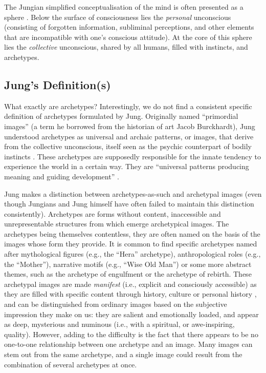 \documentclass[
]{book}
\begin{document}
The Jungian simplified conceptualisation of the mind is often presented as a sphere \citep{cann1986jungian}. Below the surface of consciousness lies the \emph{personal} unconscious (consisting of forgotten information, subliminal perceptions, and other elements that are incompatible with one's conscious attitude). At the core of this sphere lies the \emph{collective} unconscious, shared by all humans, filled with instincts, and archetypes.

\hypertarget{jungs-definitions}{%
\subsection{Jung's Definition(s)}\label{jungs-definitions}}

What exactly are archetypes? Interestingly, we do not find a consistent specific definition of archetypes formulated by Jung. Originally named ``primordial images'' (a term he borrowed from the historian of art Jacob Burckhardt), Jung understood archetypes as universal and archaic patterns, or images, that derive from the collective unconscious, itself seen as the psychic counterpart of bodily instincts \citep{feist2009theories}. These archetypes are supposedly responsible for the innate tendency to experience the world in a certain way. They are ``universal patterns producing meaning and guiding development'' \citep{roesler2012archetypes}.

Jung makes a distinction between archetypes-as-such and archetypal images (even though Jungians and Jung himself have often failed to maintain this distinction consistently). Archetypes are forms without content, inaccessible and unrepresentable structures from which emerge archetypical images. The archetypes being themselves contentless, they are often named on the basis of the images whose form they provide. It is common to find specific archetypes named after mythological figures (e.g., the ``Hera'' archetype), anthropological roles (e.g., the ``Mother''), narrative motifs (e.g., ``Wise Old Man'') or some more abstract themes, such as the archetype of engulfment or the archetype of rebirth. These archetypal images are made \emph{manifest} (i.e., explicit and consciously accessible) as they are filled with specific content through history, culture or personal history \citep{papadopoulos2012}, and can be distinguished from ordinary images based on the subjective impression they make on us: they are salient and emotionally loaded, and appear as deep, mysterious and numinous (i.e., with a spiritual, or awe-inspiring, quality). However, adding to the difficulty is the fact that there appears to be no one-to-one relationship between one archetype and an image. Many images can stem out from the same archetype, and a single image could result from the combination of several archetypes at once.
\end{document}

